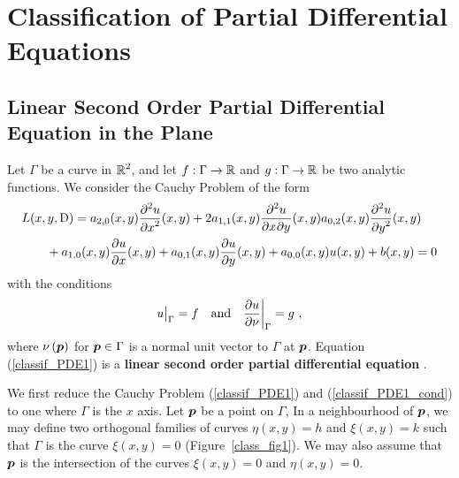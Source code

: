 \chapter{Classification of Partial Differential
Equations} \label{ChapClassifPDE}

\section{Linear Second Order Partial Differential Equation in
the Plane} \label{classif_reduction_lsoPDE}

Let $\Gamma$ be a curve in $\displaystyle \RR^2$, and let
$f:\Gamma\rightarrow \RR$ and $g:\Gamma\rightarrow \RR$ be two
analytic functions.  We consider the Cauchy Problem of the form
\begin{equation} \label{classif_PDE1}
\begin{split}
& L(x,y,\diff) = a_{2,0}(x,y) \pdydxn{u}{x}{2}(x,y) + 2a_{1,1}(x,y)
\pdydxnm{u}{x}{y}{2}{}{}(x,y) a_{0,2}(x,y) \pdydxn{u}{y}{2}(x,y) \\
&\qquad  + a_{1,0}(x,y) \pdydx{u}{x}(x,y)
+ a_{0,1}(x,y) \pdydx{u}{y}(x,y) + a_{0,0}(x,y)u(x,y) + b(x,y) = 0
\end{split}
\end{equation}
with the conditions
\begin{equation} \label{classif_PDE1_cond}
u\big|_\Gamma = f \quad \text{and} \quad \pdydx{u}{\nu}\bigg|_\Gamma = g \ ,
\end{equation}
where $\displaystyle \nu\left(\VEC{p}\right)$ for $\VEC{p} \in \Gamma$
is a normal unit vector to $\Gamma$ at $\VEC{p}$.
Equation (\ref{classif_PDE1}) is a
{\bfseries linear second order partial differential equation}%
. 

We first reduce the Cauchy Problem (\ref{classif_PDE1}) and
(\ref{classif_PDE1_cond}) to one where $\Gamma$ is the $x$ axis.  Let
$\VEC{p}$ be a point on $\Gamma$,  In a neighbourhood of $\VEC{p}$, we
may define two orthogonal families of curves $\eta(x,y)=h$ and
$\xi(x,y)=k$ such that $\Gamma$ is the curve $\xi(x,y)=0$
(Figure~\ref{class_fig1}).  We may also assume that $\VEC{p}$ is the
intersection of the curves $\xi(x,y)=0$ and $\eta(x,y)=0$.


